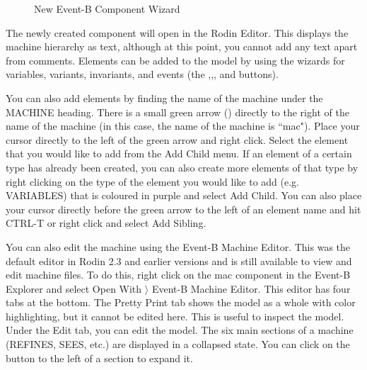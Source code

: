 \begin{figure}[!ht]
\begin{center}
	\caption{New Event-B Component Wizard}
	\label{fig_tut_03_new_component_wizard}
\end{center}
\end{figure}

The newly created component will open in the Rodin Editor. This displays the machine hierarchy as text, although at this point, you cannot add any text apart from comments. Elements can be added to the model by using the wizards for variables, variants, invariants, and events (the ,,, and  buttons). 

You can also add elements by finding the name of the machine under the MACHINE heading. There is a small green arrow () directly to the right of the name of the machine (in this case, the name of the machine is ``mac"). Place your cursor directly to the left of the green arrow and right click. Select the element that you would like to add from the \textsf{Add Child} menu. If an element of a certain type has already been created, you can also create more elements of that type by right clicking on the type of the element you would like to add (e.g. \textsf{VARIABLES}) that is coloured in purple and select \textsf{Add Child}. You can also place your cursor directly before the green arrow to the left of an element name and hit \textsf{CTRL-T} or right click and select \textsf{Add Sibling}.

You can also edit the machine using the Event-B Machine Editor. This was the default editor in Rodin 2.3 and earlier versions and is still available to view and edit machine files. To do this, right click on the \textsf{mac} component in the Event-B Explorer and select \textsf{Open With $\rangle$ Event-B Machine Editor}. This editor has four tabs at the bottom.  The \textsf{Pretty Print} tab shows the model as a whole with color highlighting, but it cannot be edited here.  This is useful to inspect the model. Under the \textsf{Edit} tab, you can edit the model.  The six main sections of a machine (REFINES, SEES, etc.) are displayed in a collapsed state.  You can click on the  button to the left of a section to expand it.


